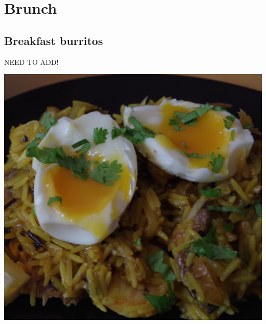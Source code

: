 \documentclass{tufte-book}
\begin{document}
\begin{figure}[p]
\hfill
{}
\end{figure}

\chapter{Brunch}

\section{Breakfast burritos}

NEED TO ADD!

\begin{marginfigure}%
  \includegraphics[width=\linewidth]{kedgeree.png}
\end{marginfigure}
\end{document}
